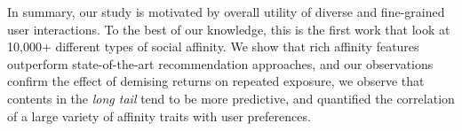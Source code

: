In summary, our study is motivated by overall utility of diverse and fine-grained user interactions. To the best of our knowledge, this is the first work that look at 10,000+ different types of social affinity.  We show that rich affinity features outperform state-of-the-art recommendation approaches, and 
our observations confirm the effect of demising returns on repeated exposure, we observe that contents in the {\em long tail} tend to be more predictive, and quantified the correlation of a large variety of affinity traits with user preferences.

